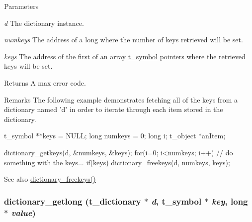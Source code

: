 \begin{DoxyParams}{Parameters}
\item[{\em d}]The dictionary instance. \item[{\em numkeys}]The address of a long where the number of keys retrieved will be set. \item[{\em keys}]The address of the first of an array \hyperlink{structt__symbol}{t\_\-symbol} pointers where the retrieved keys will be set. \end{DoxyParams}
\begin{DoxyReturn}{Returns}
A max error code.
\end{DoxyReturn}
\begin{DoxyRemark}{Remarks}
The following example demonstrates fetching all of the keys from a dictionary named 'd' in order to iterate through each item stored in the dictionary. 
\begin{DoxyCode}
    t_symbol    **keys = NULL;
    long        numkeys = 0;
    long        i;
    t_object    *anItem;

    dictionary_getkeys(d, &numkeys, &keys);
    for(i=0; i<numkeys; i++){
        // do something with the keys...
    }
    if(keys)
        dictionary_freekeys(d, numkeys, keys);
\end{DoxyCode}

\end{DoxyRemark}
\begin{DoxySeeAlso}{See also}
\hyperlink{group__dictionary_ga38077c67f36917a708c4867351d6444e}{dictionary\_\-freekeys()} 
\end{DoxySeeAlso}
\hypertarget{group__dictionary_gafd215503871278e2ae02c1c747f39e46}{
\subsubsection[{dictionary\_\-getlong}]{ dictionary\_\-getlong ({\bf t\_\-dictionary} $\ast$ {\em d}, \/  {\bf t\_\-symbol} $\ast$ {\em key}, \/  long $\ast$ {\em value})}}
\label{group__dictionary_gafd215503871278e2ae02c1c747f39e46}


